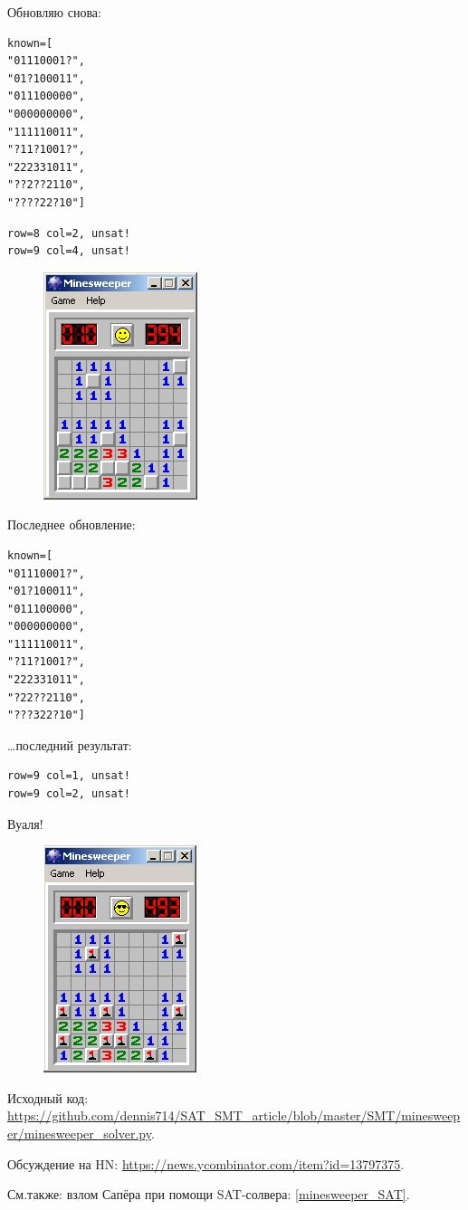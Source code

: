 Обновляю снова:

\begin{lstlisting}
known=[
"01110001?",
"01?100011",
"011100000",
"000000000",
"111110011",
"?11?1001?",
"222331011",
"??2??2110",
"????22?10"]
\end{lstlisting}

\begin{lstlisting}
row=8 col=2, unsat!
row=9 col=4, unsat!
\end{lstlisting}

\begin{figure}[H]
\centering
\includegraphics[scale=0.75]{SMT/minesweeper/4.png}
\end{figure}

Последнее обновление:

\begin{lstlisting}
known=[
"01110001?",
"01?100011",
"011100000",
"000000000",
"111110011",
"?11?1001?",
"222331011",
"?22??2110",
"???322?10"]
\end{lstlisting}

\dots последний результат:

\begin{lstlisting}
row=9 col=1, unsat!
row=9 col=2, unsat!
\end{lstlisting}

Вуаля!

\begin{figure}[H]
\centering
\includegraphics[scale=0.75]{SMT/minesweeper/5.png}
\end{figure}

Исходный код: \url{https://github.com/dennis714/SAT_SMT_article/blob/master/SMT/minesweeper/minesweeper_solver.py}.

Обсуждение на HN: \url{https://news.ycombinator.com/item?id=13797375}.

См.также: взлом Сапёра при помощи SAT-солвера: \ref{minesweeper_SAT}.

